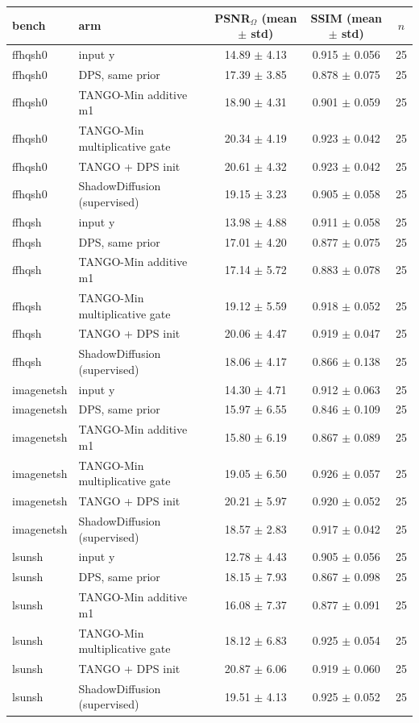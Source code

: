 \begin{tabular}{llccc}
\toprule
bench & arm & PSNR$_\Omega$ (mean $\pm$ std) & SSIM (mean $\pm$ std) & $n$\\
\midrule
ffhqsh0 & input y & 14.89 $\pm$ 4.13 & 0.915 $\pm$ 0.056 & 25\\
ffhqsh0 & DPS, same prior & 17.39 $\pm$ 3.85 & 0.878 $\pm$ 0.075 & 25\\
ffhqsh0 & TANGO-Min additive m1 & 18.90 $\pm$ 4.31 & 0.901 $\pm$ 0.059 & 25\\
ffhqsh0 & TANGO-Min multiplicative gate & 20.34 $\pm$ 4.19 & 0.923 $\pm$ 0.042 & 25\\
ffhqsh0 & TANGO + DPS init & 20.61 $\pm$ 4.32 & 0.923 $\pm$ 0.042 & 25\\
ffhqsh0 & ShadowDiffusion (supervised) & 19.15 $\pm$ 3.23 & 0.905 $\pm$ 0.058 & 25\\
\midrule
ffhqsh & input y & 13.98 $\pm$ 4.88 & 0.911 $\pm$ 0.058 & 25\\
ffhqsh & DPS, same prior & 17.01 $\pm$ 4.20 & 0.877 $\pm$ 0.075 & 25\\
ffhqsh & TANGO-Min additive m1 & 17.14 $\pm$ 5.72 & 0.883 $\pm$ 0.078 & 25\\
ffhqsh & TANGO-Min multiplicative gate & 19.12 $\pm$ 5.59 & 0.918 $\pm$ 0.052 & 25\\
ffhqsh & TANGO + DPS init & 20.06 $\pm$ 4.47 & 0.919 $\pm$ 0.047 & 25\\
ffhqsh & ShadowDiffusion (supervised) & 18.06 $\pm$ 4.17 & 0.866 $\pm$ 0.138 & 25\\
\midrule
imagenetsh & input y & 14.30 $\pm$ 4.71 & 0.912 $\pm$ 0.063 & 25\\
imagenetsh & DPS, same prior & 15.97 $\pm$ 6.55 & 0.846 $\pm$ 0.109 & 25\\
imagenetsh & TANGO-Min additive m1 & 15.80 $\pm$ 6.19 & 0.867 $\pm$ 0.089 & 25\\
imagenetsh & TANGO-Min multiplicative gate & 19.05 $\pm$ 6.50 & 0.926 $\pm$ 0.057 & 25\\
imagenetsh & TANGO + DPS init & 20.21 $\pm$ 5.97 & 0.920 $\pm$ 0.052 & 25\\
imagenetsh & ShadowDiffusion (supervised) & 18.57 $\pm$ 2.83 & 0.917 $\pm$ 0.042 & 25\\
\midrule
lsunsh & input y & 12.78 $\pm$ 4.43 & 0.905 $\pm$ 0.056 & 25\\
lsunsh & DPS, same prior & 18.15 $\pm$ 7.93 & 0.867 $\pm$ 0.098 & 25\\
lsunsh & TANGO-Min additive m1 & 16.08 $\pm$ 7.37 & 0.877 $\pm$ 0.091 & 25\\
lsunsh & TANGO-Min multiplicative gate & 18.12 $\pm$ 6.83 & 0.925 $\pm$ 0.054 & 25\\
lsunsh & TANGO + DPS init & 20.87 $\pm$ 6.06 & 0.919 $\pm$ 0.060 & 25\\
lsunsh & ShadowDiffusion (supervised) & 19.51 $\pm$ 4.13 & 0.925 $\pm$ 0.052 & 25\\
\bottomrule
\end{tabular}
